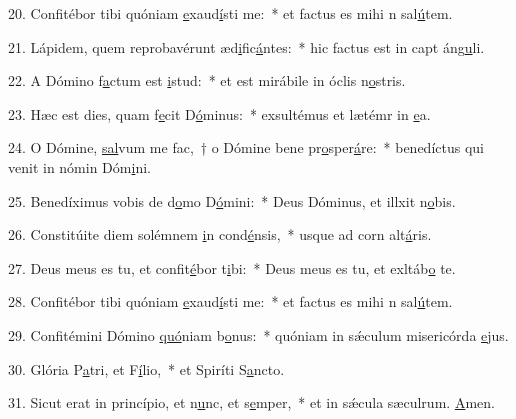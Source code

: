 20. Confitébor tibi quóniam \uline{e}xaud\uline{í}sti me:~* et factus es mihi n sal\uline{ú}tem.\par 
21. Lápidem, quem reprobavérunt æd\uline{i}fic\uline{á}ntes:~* hic factus est in capt áng\uline{u}li.\par 
22. A Dómino f\uline{a}ctum est \uline{i}stud:~* et est mirábile in óclis n\uline{o}stris.\par 
23. Hæc est dies, quam f\uline{e}cit D\uline{ó}minus:~* exsultémus et lætémr in \uline{e}a.\par 
24. O Dómine, \uline{sal}vum me fac,~† o Dómine bene pr\uline{o}sper\uline{á}re:~* benedíctus qui venit in nómin Dóm\uline{i}ni.\par 
25. Benedíximus vobis de d\uline{o}mo D\uline{ó}mini:~* Deus Dóminus, et illxit n\uline{o}bis.\par 
26. Constitúite diem solémnem \uline{i}n cond\uline{é}nsis,~* usque ad corn alt\uline{á}ris.\par 
27. Deus meus es tu, et confit\uline{é}bor t\uline{i}bi:~* Deus meus es tu, et exltáb\uline{o} te.\par 
28. Confitébor tibi quóniam \uline{e}xaud\uline{í}sti me:~* et factus es mihi n sal\uline{ú}tem.\par 
29. Confitémini Dómino \uline{quó}niam b\uline{o}nus:~* quóniam in sǽculum misericórda \uline{e}jus.\par 
30. Glória P\uline{a}tri, et F\uline{í}lio,~* et Spiríti S\uline{a}ncto.\par 
31. Sicut erat in princípio, et n\uline{u}nc, et s\uline{e}mper,~* et in sǽcula sæculrum. \uline{A}men.\par 
